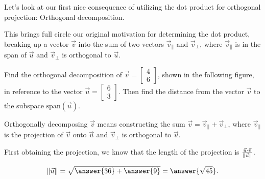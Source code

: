 \documentclass{ximera}
\begin{document}
\begin{exploration}
   Let's look at our first nice consequence of utilizing the dot product for orthogonal projection: Orthogonal decomposition.

   This brings full circle our original motivation for determining the dot product, breaking up a vector $\vec{v}$ into the sum of two vectors $\vec{v}_\parallel$ and $\vec{v}_\perp$, where $\vec{v}_\parallel$ is in the span of $\vec{u}$ and $\vec{v}_\perp$ is orthogonal to $\vec{u}$.

   \begin{example}\label{ex:projection1}
      Find the orthogonal decomposition of $\vec{v}=\begin{bmatrix}
      4\\6
      \end{bmatrix}$, shown in the following figure, in reference to the vector $\vec{u}=\begin{bmatrix}
         6\\3
      \end{bmatrix}$. Then find the distance from the vector $\vec{v}$ to the subspace $\mbox{span}(\vec{u})$.
       
      \begin{center}
      \end{center}
       
      Orthogonally decomposing $\vec{v}$ means constructing the sum $\vec{v}=\vec{v}_\parallel+\vec{v}_\perp$, where $\vec{v}_\parallel$ is the projection of $\vec{v}$ onto $\vec{u}$ and $\vec{v}_\perp$ is orthogonal to $\vec{u}$.

      First obtaining the projection, we know that the length of the projection is $\frac{\vec{u}\cdot\vec{v}}{\left\|\vec{u}\right\|}$. 

      $$\norm{\vec{u}}=\sqrt{\answer{36}+\answer{9}}=\answer{\sqrt{45}}.$$


\end{example}
\end{exploration}
\end{document}
